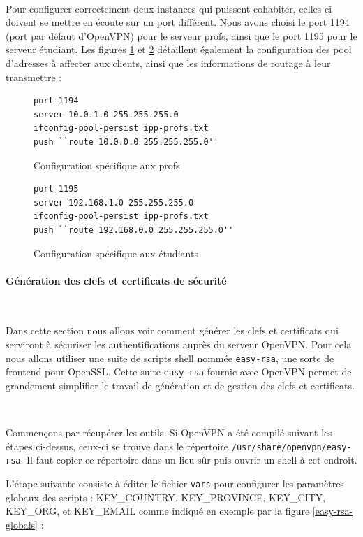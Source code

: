 ~

Pour configurer correctement deux instances qui puissent cohabiter, celles-ci doivent se mettre en écoute sur un port différent. Nous avons choisi le port 1194 (port par défaut d'OpenVPN) pour le serveur profs, ainsi que le port 1195 pour le serveur étudiant. Les figures \ref{configuration_base_prof} et \ref{configuration_base_student} détaillent également la configuration des pool d'adresses à affecter aux clients, ainsi que les informations de routage à leur transmettre :

\begin{figure}[H]
	\begin{lstlisting}[frame=trBL]
port 1194
server 10.0.1.0 255.255.255.0
ifconfig-pool-persist ipp-profs.txt
push ``route 10.0.0.0 255.255.255.0''
	\end{lstlisting}
	\caption{Configuration spécifique aux profs}
	\label{configuration_base_prof}
\end{figure}
\begin{figure}[H]
	\begin{lstlisting}[frame=trBL]
port 1195
server 192.168.1.0 255.255.255.0
ifconfig-pool-persist ipp-profs.txt
push ``route 192.168.0.0 255.255.255.0''
	\end{lstlisting}
	\caption{Configuration spécifique aux étudiants}
	\label{configuration_base_student}
\end{figure}


\paragraph{Génération des clefs et certificats de sécurité}
~

Dans cette section nous allons voir comment générer les clefs et certificats qui serviront à sécuriser les authentifications auprès du serveur OpenVPN. Pour cela nous allons utiliser une suite de scripts shell nommée \verb|easy-rsa|, une sorte de frontend pour OpenSSL. Cette suite \verb|easy-rsa| fournie avec OpenVPN permet de grandement simplifier le travail de génération et de gestion des clefs et certificats.

~

Commençons par récupérer les outils. Si OpenVPN a été compilé suivant les étapes ci-dessus, ceux-ci se trouve dans le répertoire \verb|/usr/share/openvpn/easy-rsa|. Il faut copier ce répertoire dans un lieu sûr puis ouvrir un shell à cet endroit.

L'étape suivante consiste à éditer le fichier \verb|vars| pour configurer les paramètres globaux des scripts : KEY\_COUNTRY, KEY\_PROVINCE, KEY\_CITY, KEY\_ORG, et KEY\_EMAIL comme indiqué en exemple par la figure \ref{easy-rsa-globals} :

